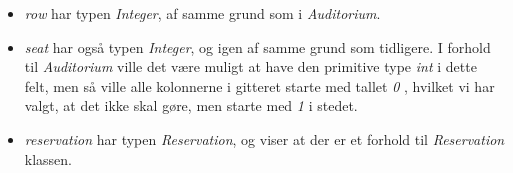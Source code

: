 \begin{itemize}
  \item \textit{row} har typen \textit{Integer}, af samme grund som i \textit{Auditorium}.
  \item \textit{seat} har også typen \textit{Integer}, og igen af samme grund som tidligere. I forhold til \textit{Auditorium} ville det være muligt at have den primitive type \textit{int} i dette felt, men så ville alle kolonnerne i gitteret starte med tallet \textit{0} , hvilket vi har valgt, at det ikke skal gøre, men starte med \textit{1} i stedet.
  \item \textit{reservation} har typen \textit{Reservation}, og viser at der er et forhold til \textit{Reservation} klassen.
\end{itemize}




